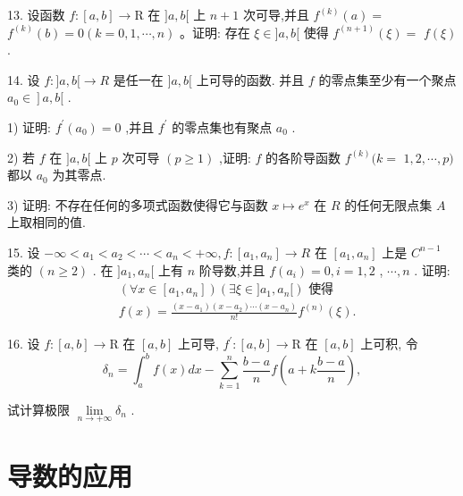 13. 设函数 $f : \left\lbrack  {a,b}\right\rbrack   \rightarrow  \mathrm{R}$ 在 $\rbrack a,b\lbrack$ 上 $n + 1$ 次可导,并且 ${f}^{\left( k\right) }\left( a\right)  =$  ${f}^{\left( k\right) }\left( b\right)  = 0\left( {k = 0,1,\cdots ,n}\right)$ 。证明: 存在 $\xi  \in  \rbrack a,b\lbrack$ 使得 ${f}^{\left( n + 1\right) }\left( \xi \right)  =$  $f\left( \xi \right)$ .

14. 设 $f : \rbrack a,b\lbrack  \rightarrow  R$ 是任一在 $\rbrack a,b\lbrack$ 上可导的函数. 并且 $f$ 的零点集至少有一个聚点 $\left. {{a}_{0} \in  }\right\rbrack  a,b\lbrack$ .

1) 证明: ${f}^{\prime }\left( {a}_{0}\right)  = 0$ ,并且 ${f}^{\prime }$ 的零点集也有聚点 ${a}_{0}$ .

2) 若 $f$ 在 $\rbrack a,b\lbrack$ 上 $p$ 次可导 $\left( {p \geq  1}\right)$ ,证明: $f$ 的各阶导函数 ${f}^{\left( k\right) }(k =$  $1,2,\cdots ,p)$ 都以 ${a}_{0}$ 为其零点.

3) 证明: 不存在任何的多项式函数使得它与函数 $x \mapsto  {e}^{x}$ 在 $R$ 的任何无限点集 $A$ 上取相同的值.

15. 设 $- \infty  < {a}_{1} < {a}_{2} < \cdots  < {a}_{n} <  + \infty ,f : \left\lbrack  {{a}_{1},{a}_{n}}\right\rbrack   \rightarrow  R$ 在 $\left\lbrack  {{a}_{1},{a}_{n}}\right\rbrack$ 上是 ${C}^{n - 1}$ 类的 $\left( {n \geq  2}\right)$ . 在 $\rbrack {a}_{1},{a}_{n}\lbrack$ 上有 $n$ 阶导数,并且 $f\left( {a}_{i}\right)  = 0,i = 1,2$ , $\cdots ,n$ . 证明:
\begin{align*}
	&\left( {\forall x \in  \left\lbrack  {{a}_{1},{a}_{n}}\right\rbrack  }\right) \left( {\exists \xi  \in  \rbrack {a}_{1},{a}_{n}\lbrack }\right) \text{ 使得 }\\
	&f\left( x\right)  = \frac{\left( {x - {a}_{1}}\right) \left( {x - {a}_{2}}\right) \cdots \left( {x - {a}_{n}}\right) }{n!}{f}^{\left( n\right) }\left( \xi \right) .
\end{align*}

16. 设 $f : \left\lbrack  {a,b}\right\rbrack   \rightarrow  \mathrm{R}$ 在 $\left\lbrack  {a,b}\right\rbrack$ 上可导, ${f}^{\prime } : \left\lbrack  {a,b}\right\rbrack   \rightarrow  \mathrm{R}$ 在 $\left\lbrack  {a,b}\right\rbrack$ 上可积, 令
$${\delta }_{n} = {\int }_{a}^{b}f\left( x\right) {dx} - \mathop{\sum }\limits_{{k = 1}}^{n}\frac{b - a}{n}f\left( {a + k\frac{b - a}{n}}\right) ,$$

试计算极限 $\mathop{\lim }\limits_{{n \rightarrow   + \infty }}{\delta }_{n}$ .

\section{导数的应用}

